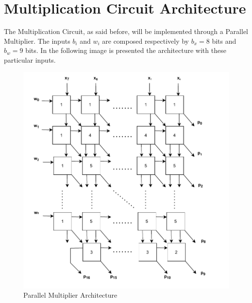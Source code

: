 \section{Multiplication Circuit Architecture}
The Multiplication Circuit, as said before, will be implemented through a Parallel Multiplier. The inputs $b_{i}$ and $w_{i}$ are composed respectively by $b_{x} = 8$ bits and $b_{w} = 9$ bits. In the following image is presented the architecture with these particular inputs.
\begin{figure}[H]
	\centering
	\includegraphics[width=13cm]{img/architecture_parallel_multiplier.pdf}
	\caption{Parallel Multiplier Architecture}
\end{figure}
